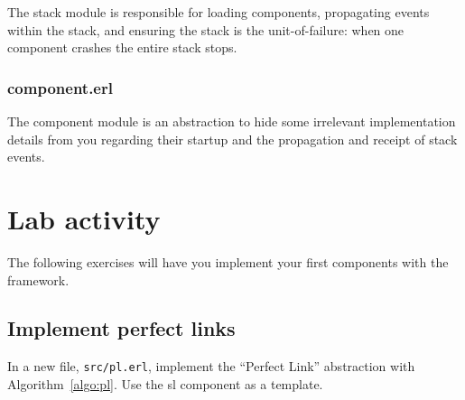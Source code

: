 \documentclass[a4paper]{article}
\begin{document}
The stack module is responsible for loading components, propagating events
within the stack, and ensuring the stack is the unit-of-failure: when one
component crashes the entire stack stops.


\subsubsection{component.erl} %
\label{sub:component_erl}

The component module is an abstraction to hide some irrelevant implementation
details from you regarding their startup and the propagation and receipt of
stack events.





\section{Lab activity} %
\label{sec:lab_activity}

The following exercises will have you implement your first components with the
framework.

\subsection{Implement perfect links} %
\label{sub:implement_pl}

In a new file, \verb!src/pl.erl!, implement the ``Perfect Link'' abstraction
with Algorithm~\ref{algo:pl}. Use the sl component as a template.


%
%
%
\end{document}
